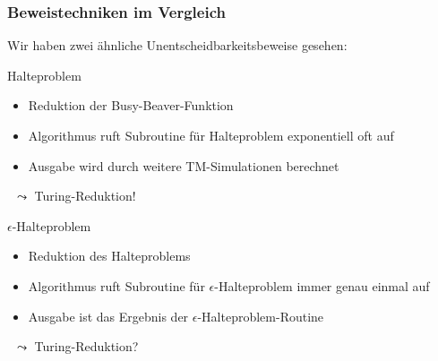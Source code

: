 \documentclass[aspectratio=1610,onlymath]{beamer}
\begin{document}
\begin{frame}\frametitle{Beweistechniken im Vergleich}

Wir haben zwei ähnliche Unentscheidbarkeitsbeweise gesehen:\bigskip

\begin{minipage}{5cm}
\alert{Halteproblem}
\begin{itemize}
\item Reduktion der Busy-Beaver-Funktion
\item Algorithmus ruft Subroutine für Halteproblem exponentiell oft auf
\item Ausgabe wird durch weitere TM-Simulationen berechnet
\end{itemize}\bigskip
~\hspace{5mm}$\leadsto$ Turing-Reduktion!
\end{minipage}%
\begin{minipage}{5cm}
\alert{$\epsilon$-Halteproblem}
\begin{itemize}
\item Reduktion des Halteproblems
\item Algorithmus ruft Subroutine für $\epsilon$-Halteproblem immer genau einmal auf
\item Ausgabe ist das Ergebnis der $\epsilon$-Halteproblem-Routine
\end{itemize}\bigskip
~\hspace{5mm}$\leadsto$ Turing-Reduktion?
\end{minipage}

\end{frame}
\end{document}
